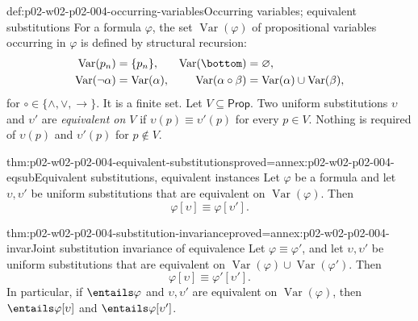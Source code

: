 \begin{hbdefinition}{def:p02-w02-p02-004-occurring-variables}{Occurring variables; equivalent substitutions}
For a formula \(\varphi\), the set \(\operatorname{Var}(\varphi)\) of
propositional variables occurring in \(\varphi\) is defined by structural
recursion:
\[
\begin{aligned}
 \operatorname{Var}(p_n)&=\{p_n\},&
 \operatorname{Var}(\bottom)&=\varnothing,\\
 \operatorname{Var}(\neg\alpha)&=\operatorname{Var}(\alpha),&
 \operatorname{Var}(\alpha\circ\beta)
   &=\operatorname{Var}(\alpha)\cup\operatorname{Var}(\beta),
\end{aligned}
\]
for \(\circ\in\{\land,\lor,\to\}\).  It is a finite set.
Let \(V\subseteq\mathsf{Prop}\).  Two uniform substitutions \(\upsilon\) and
\(\upsilon'\) are \emph{equivalent on \(V\)} if
\(\upsilon(p)\equiv\upsilon'(p)\) for every \(p\in V\).  Nothing is required
of \(\upsilon(p)\) and \(\upsilon'(p)\) for \(p\notin V\).
\end{hbdefinition}

\begin{hbtheorem}{thm:p02-w02-p02-004-equivalent-substitutions}{proved=annex:p02-w02-p02-004-eqsub}{Equivalent substitutions, equivalent instances}
Let \(\varphi\) be a formula and let \(\upsilon,\upsilon'\) be uniform
substitutions that are equivalent on \(\operatorname{Var}(\varphi)\).  Then
\[
 \varphi[\upsilon]\equiv\varphi[\upsilon'].
\]
\end{hbtheorem}

\begin{hbcorollary}{thm:p02-w02-p02-004-substitution-invariance}{proved=annex:p02-w02-p02-004-invar}{Joint substitution invariance of equivalence}
Let \(\varphi\equiv\varphi'\), and let \(\upsilon,\upsilon'\) be uniform
substitutions that are equivalent on
\(\operatorname{Var}(\varphi)\cup\operatorname{Var}(\varphi')\).  Then
\[
 \varphi[\upsilon]\equiv\varphi'[\upsilon'].
\]
In particular, if \(\entails\varphi\) and \(\upsilon,\upsilon'\) are
equivalent on \(\operatorname{Var}(\varphi)\), then
\(\entails\varphi[\upsilon]\) and \(\entails\varphi[\upsilon']\).
\end{hbcorollary}

